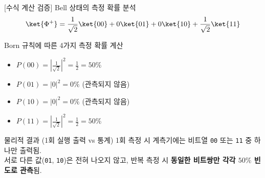 \documentclass[aspectratio=169, 10pt]{beamer}
\begin{document}
\begin{frame}{[수식 계산 검증] Bell 상태의 측정 확률 분석}
    $$\ket{\Phi^+} = \frac{1}{\sqrt{2}}\ket{00} + 0\ket{01} + 0\ket{10} + \frac{1}{\sqrt{2}}\ket{11}$$
    \vspace{0.2cm}
    \begin{qcblock}{Born 규칙에 따른 4가지 측정 확률 계산}
        \begin{itemize}
            \item $P(00) = \left|\frac{1}{\sqrt{2}}\right|^2 = \frac{1}{2} = 50\%$
            \pause
            \item $P(01) = |0|^2 = 0\%$ (관측되지 않음)
            \pause
            \item $P(10) = |0|^2 = 0\%$ (관측되지 않음)
            \pause
            \item $P(11) = \left|\frac{1}{\sqrt{2}}\right|^2 = \frac{1}{2} = 50\%$
        \end{itemize}
    \end{qcblock}
    \pause
    \vspace{0.2cm}
    \begin{qcalert}{물리적 결과 (1회 실행 출력 vs 통계)}
        1회 측정 시 계측기에는 비트열 \texttt{00} 또는 \texttt{11} 중 하나만 출력됨.\\
        서로 다른 값(\texttt{01}, \texttt{10})은 전혀 나오지 않고, 반복 측정 시 \textbf{동일한 비트쌍만 각각 $50\%$ 빈도로 관측}됨.
    \end{qcalert}
\end{frame}
\end{document}
